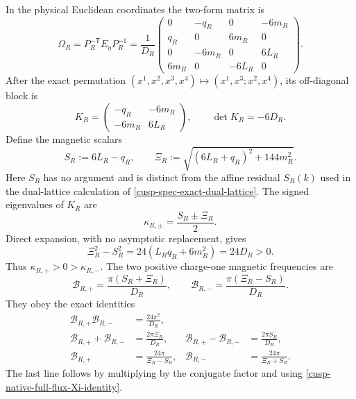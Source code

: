 In the physical Euclidean coordinates the two-form matrix is
\begin{equation}
 \Omega_R=P_R^{-\mathsf T}E_\eta P_R^{-1}
 =\frac1{D_R}
 \begin{pmatrix}
 0&-q_R&0&-6m_R\\
 q_R&0&6m_R&0\\
 0&-6m_R&0&6L_R\\
 6m_R&0&-6L_R&0
 \end{pmatrix}.
 \label{cusp-native-full-flux-physical-matrix}
\end{equation}
After the exact permutation
\((x^1,x^2,x^3,x^4)\mapsto(x^1,x^3;x^2,x^4)\), its off-diagonal block is
\begin{equation}
 K_R=\begin{pmatrix}-q_R&-6m_R\\-6m_R&6L_R\end{pmatrix},
 \qquad \det K_R=-6D_R.
 \label{cusp-native-full-flux-K}
\end{equation}
Define the magnetic scalars
\begin{equation}
 S_R:=6L_R-q_R,
 \qquad
 \Xi_R:=\sqrt{(6L_R+q_R)^2+144m_R^2}.
 \label{cusp-native-full-flux-S-Xi}
\end{equation}
Here \(S_R\) has no argument and is distinct from the affine residual
\(S_R(k)\) used in the dual-lattice calculation of
\cref{cusp-spec-exact-dual-lattice}.  The signed eigenvalues of \(K_R\) are
\begin{equation}
 \kappa_{R,\pm}=\frac{S_R\pm\Xi_R}{2}.
 \label{cusp-native-full-flux-kappas}
\end{equation}
Direct expansion, with no asymptotic replacement, gives
\begin{equation}
 \Xi_R^2-S_R^2
 =24(L_Rq_R+6m_R^2)=24D_R>0.
 \label{cusp-native-full-flux-Xi-identity}
\end{equation}
Thus \(\kappa_{R,+}>0>\kappa_{R,-}\).  The two positive charge-one
magnetic frequencies are
\begin{equation}
 \boxed{
 \mathcal B_{R,+}=\frac{\pi(S_R+\Xi_R)}{D_R},
 \qquad
 \mathcal B_{R,-}=\frac{\pi(\Xi_R-S_R)}{D_R}.}
 \label{cusp-native-full-flux-frequencies}
\end{equation}
They obey the exact identities
\begin{align}
 \mathcal B_{R,+}\mathcal B_{R,-}
 &=\frac{24\pi^2}{D_R},
 \label{cusp-native-full-flux-frequency-product}\\
 \mathcal B_{R,+}+\mathcal B_{R,-}
 &=\frac{2\pi\Xi_R}{D_R},&
 \mathcal B_{R,+}-\mathcal B_{R,-}
 &=\frac{2\pi S_R}{D_R},
 \label{cusp-native-full-flux-frequency-sum-difference}\\
 \mathcal B_{R,+}&=\frac{24\pi}{\Xi_R-S_R},&
 \mathcal B_{R,-}&=\frac{24\pi}{\Xi_R+S_R}.
 \label{cusp-native-full-flux-rationalized-frequencies}
\end{align}
The last line follows by multiplying by the conjugate factor and using
\cref{cusp-native-full-flux-Xi-identity}.

